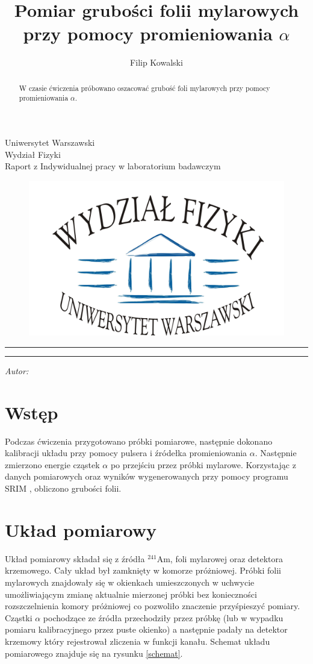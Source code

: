 \documentclass[12pt,a4paper]{article}
\author{Filip Kowalski }
\title{Pomiar grubości folii mylarowych przy pomocy promieniowania $\alpha$}
\makeatletter
\newcommand{\linia}{\rule{\linewidth}{0.4mm}}
\renewcommand{\maketitle}{\begin{titlepage}
    \vspace*{1cm}
    \begin{center}\small
    Uniwersytet Warszawski\\
    Wydział Fizyki\\
   Raport z Indywidualnej pracy w laboratorium badawczym
    \end{center}
    
\begin{figure}[h]
    \centering
    \includegraphics[scale=0.5]{logo.jpg}
    \end{figure}


    \vspace{3cm}
    \noindent\linia
    \begin{center}
      \LARGE \textsc{\@title}
         \end{center}
     \linia
    \vspace{0.5cm}
    \begin{flushright}
    \begin{minipage}{5cm}
    \textit{\small Autor:}\\
    \normalsize \textsc{\@author} \par
    \end{minipage}
    \vspace{5cm}
    
     \end{flushright}
    \vspace*{\stretch{6}}
    \begin{center}
    \@date
    \end{center}
         \end{titlepage}}
\makeatother
\begin{document}
\maketitle
\begin{abstract}
W czasie ćwiczenia próbowano oszacować grubość foli mylarowych przy pomocy promieniowania $\alpha$. 
\end{abstract}
\section{Wstęp}
Podczas ćwiczenia przygotowano próbki pomiarowe, następnie dokonano kalibracji układu przy pomocy pulsera i źródełka promieniowania $\alpha$. Następnie zmierzono energie cząstek $\alpha$ po przejściu przez próbki mylarowe. Korzystając z danych pomiarowych oraz wyników wygenerowanych przy pomocy programu SRIM \cite{srim}, obliczono grubości folii.

\section{Układ pomiarowy}
Układ pomiarowy składał się z źródła ${}^{241}_{}{}$Am, foli mylarowej oraz detektora krzemowego. Cały układ był zamknięty w komorze próżniowej. Próbki folii mylarowych znajdowały się w okienkach umieszczonych w uchwycie umożliwiającym zmianę aktualnie mierzonej próbki bez konieczności rozszczelnienia komory próżniowej co pozwoliło znaczenie przyśpieszyć pomiary. 
Cząstki $\alpha$ pochodzące ze źródła przechodziły przez próbkę (lub w wypadku pomiaru kalibracyjnego przez puste okienko) a następnie padały na detektor krzemowy który rejestrował zliczenia w funkcji kanału. Schemat układu pomiarowego znajduje się na rysunku \ref{schemat}.
\end{document}

